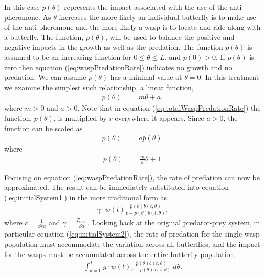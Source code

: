 \documentclass[review,authoryear]{elsarticle}
\newcommand{\origB}{{b}}
\newcommand{\origW}{{w}}
\newcommand{\origGamma}{{\gamma}}
\newcommand{\origC}{{c}}
\newcommand{\origG}{{g}}
\newcommand{\origL}{{L}}
\newcommand{\origP}[1]{{p}(#1)}
\newcommand{\origTheta}{{\theta}}
\newcommand{\origT}{{t}}
\begin{document}
In this case $\origP{\origTheta}$ represents the impact associated with the use
of the anti-pheromone. As $\origTheta$ increases the more likely an
individual butterfly is to make use of the anti-pheromone and the more
likely a wasp is to locate and ride along with a butterfly. The
function, $\origP{\origTheta}$, will be used to balance the positive and
negative impacts in the growth as well as the predation.  
The function $\origP{\origTheta}$ is assumed to be an
increasing function for $0\leq\origTheta\leq \origL$, and $\origP{0}>0$. If
$\origP{\origTheta}$ is zero then equation (\ref{eq:waspPredationRate}) 
indicates no growth and no predation. We can assume $\origP{\origTheta}$ has a
minimal value at $\origTheta = 0$. In this treatment we
examine the simplest such relationship, a linear function,
\begin{eqnarray}
  \label{eq:firstDefP}
  \origP{\origTheta} & = & m \theta + a,
\end{eqnarray}
where $m>0$ and $a>0$. Note that in equation (\ref{eq:totalWaspPredationRate}) the function, $\origP{\origTheta}$, is multiplied by $r$ everywhere it appears. Since $a>0$, the function can be scaled as
\begin{eqnarray}
  \label{eq:factorP}
  \origP{\origTheta} & = & a \bar{p}(\origTheta).
\end{eqnarray}
where
\begin{eqnarray}
  \label{eq:scaleP}
  \bar{p}(\origTheta) & = & \frac{m}{a} \theta + 1.
\end{eqnarray}

Focusing on equation (\ref{eq:waspPredationRate}), the rate of
predation can now be approximated.  The result can be immediately
substituted into equation (\ref{eq:initialSystem1}) in the more
traditional form as
\begin{eqnarray}
  \label{eq:butterflyPredationRate}
  \origGamma \cdot w(\origT) \frac{\bar{p}(\origTheta) \origB(\origT,\origTheta) }{\origC +  \bar{p}(\origTheta) \origB(\origT,\origTheta)},
\end{eqnarray}
where $\origC=\frac{1}{\beta r a}$ and
$\origGamma=\frac{T_{\mathrm{total}}}{\beta a}$.  Looking back at the
original predator-prey system, in particular equation
(\ref{eq:initialSystem2}), the rate of predation for the single wasp
population must accommodate the variation across all butterflies, and
the impact for the wasps must be accumulated across the entire
butterfly population,
\begin{eqnarray}
  \label{eq:totalWaspPredationRate}
  \int^{\origL}_{\origTheta=0} \origG \cdot \origW(\origT) \frac{\bar{p}(\origTheta) \origB(\origT,\origTheta) }{\origC + \bar{p}(\origTheta) \origB(\origT,\origTheta)} ~ d\origTheta.
\end{eqnarray}
\end{document}
